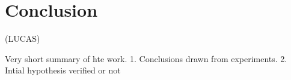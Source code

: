\section{Conclusion}


(LUCAS)

Very short summary of hte work.
1. Conclusions drawn from experiments.
2. Intial hypothesis verified or not
